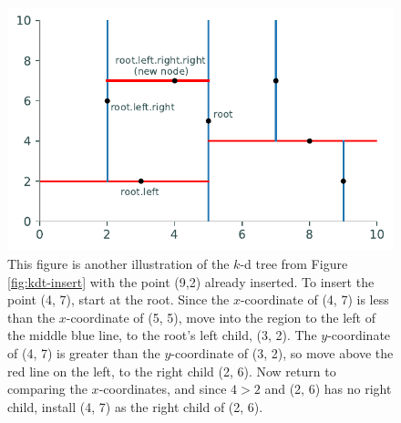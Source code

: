 \begin{figure}[H]
\includegraphics[width=.9\textwidth]{figures/kdpic5.pdf}
\caption{This figure is another illustration of the $k$-d tree from Figure \ref{fig:kdt-insert} with the point (9,2) already inserted. To insert the point (4, 7), start at the root. Since the $x$-coordinate of (4, 7) is less than the $x$-coordinate of (5, 5), move into the region to the left of the middle blue line, to the root's left child, (3, 2). The $y$-coordinate of (4, 7) is greater than the $y$-coordinate of (3, 2), so move above the red line on the left, to the right child (2, 6). Now return to comparing the $x$-coordinates, and since $4 > 2$ and (2, 6) has no right child, install (4, 7) as the right child of (2, 6).}
\label{fig:k-insert}
\end{figure}

